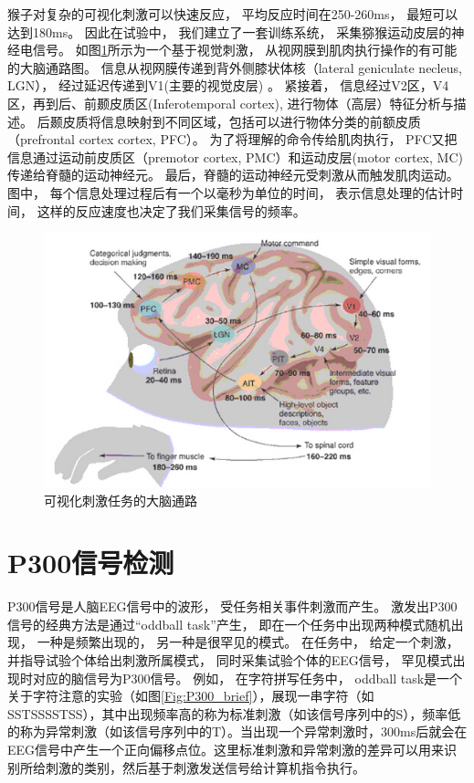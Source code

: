 猴子对复杂的可视化刺激可以快速反应， 平均反应时间在250-260ms， 最短可以达到180ms。 因此在试验中， 我们建立了一套训练系统， 采集猕猴运动皮层的神经电信号。 如图\ref{Fig:brain_stimulate_flow}所示为一个基于视觉刺激， 从视网膜到肌肉执行操作的有可能的大脑通路图\cite{thorpe2001seeking}。 信息从视网膜传递到背外侧膝状体核（lateral geniculate necleus, LGN）， 经过延迟传递到V1(主要的视觉皮层) 。 紧接着， 信息经过V2区，V4区，再到后、前颞皮质区(Inferotemporal cortex), 进行物体（高层）特征分析与描述。 后颞皮质将信息映射到不同区域，包括可以进行物体分类的前额皮质（prefrontal cortex cortex, PFC）。 为了将理解的命令传给肌肉执行， PFC又把信息通过运动前皮质区（premotor cortex, PMC）和运动皮层(motor cortex, MC)传递给脊髓的运动神经元。 最后，脊髓的运动神经元受刺激从而触发肌肉运动。 图中， 每个信息处理过程后有一个以毫秒为单位的时间， 表示信息处理的估计时间， 这样的反应速度也决定了我们采集信号的频率。

\begin{figure}[htb]
\centering
\includegraphics{Pictures/Introduction/brain_flow.jpg}
\caption{可视化刺激任务的大脑通路}
\label{Fig:brain_stimulate_flow}
\end{figure}



\section{P300信号检测}\label{sec:introduction_p300}

P300信号是人脑EEG信号中的波形， 受任务相关事件刺激而产生。 激发出P300信号的经典方法是通过“oddball task”产生， 即在一个任务中出现两种模式随机出现， 一种是频繁出现的， 另一种是很罕见的模式。 在任务中， 给定一个刺激，并指导试验个体给出刺激所属模式， 同时采集试验个体的EEG信号， 罕见模式出现时对应的脑信号为P300信号。 例如， 在字符拼写任务中， oddball task是一个关于字符注意的实验（如图\ref{Fig:P300_brief}），展现一串字符（如SSTSSSSTSS），其中出现频率高的称为标准刺激（如该信号序列中的S），频率低的称为异常刺激（如该信号序列中的T）。当出现一个异常刺激时，300ms后就会在EEG信号中产生一个正向偏移点位。这里标准刺激和异常刺激的差异可以用来识别所给刺激的类别，然后基于刺激发送信号给计算机指令执行。
 
